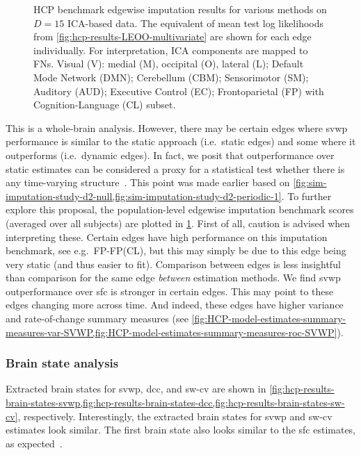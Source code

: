 \begin{figure}[t]
  \caption{
    HCP benchmark edgewise imputation results for various methods on $D = 15$ ICA-based data.
    The equivalent of mean test log likelihoods from \cref{fig:hcp-results-LEOO-multivariate} are shown for each edge individually.
    For interpretation, ICA components are mapped to FNs.
    Visual (V): medial (M), occipital (O), lateral (L); Default Mode Network (DMN); Cerebellum (CBM); Sensorimotor (SM); Auditory (AUD); Executive Control (EC); Frontoparietal (FP) with Cognition-Language (CL) subset.
  }
  \label{fig:hcp-results-edgewise-imputation-benchmark}
\end{figure}


This is a whole-brain analysis.
However, there may be certain edges where \gls{svwp} performance is similar to the static approach (i.e.~static edges) and some where it outperforms (i.e.~dynamic edges).
In fact, we posit that outperformance over static estimates can be considered a proxy for a statistical test whether there is any time-varying structure~\parencite[see also][]{Zalesky2014, Hindriks2016}.
This point was made earlier based on \cref{fig:sim-imputation-study-d2-null,fig:sim-imputation-study-d2-periodic-1}.
To further explore this proposal, the population-level edgewise imputation benchmark scores (averaged over all subjects) are plotted in \cref{fig:hcp-results-edgewise-imputation-benchmark}.
First of all, caution is advised when interpreting these.
Certain edges have high performance on this imputation benchmark, see e.g.~FP-FP(CL), but this may simply be due to this edge being very static (and thus easier to fit).
Comparison between edges is less insightful than comparison for the same edge \emph{between} estimation methods.
%
We find \gls{svwp} outperformance over \gls{sfc} is stronger in certain edges.
This may point to these edges changing more across time.
And indeed, these edges have higher variance and rate-of-change summary measures (see \cref{fig:HCP-model-estimates-summary-measures-var-SVWP,fig:HCP-model-estimates-summary-measures-roc-SVWP}).

\subsubsection{Brain state analysis}

Extracted brain states for \gls{svwp}, \gls{dcc}, and \gls{sw-cv} are shown in \cref{fig:hcp-results-brain-states-svwp,fig:hcp-results-brain-states-dcc,fig:hcp-results-brain-states-sw-cv}, respectively.
Interestingly, the extracted brain states for \gls{svwp} and \gls{sw-cv} estimates look similar.
The first brain state also looks similar to the \gls{sfc} estimates, as expected~\parencite{Allen2014}.


